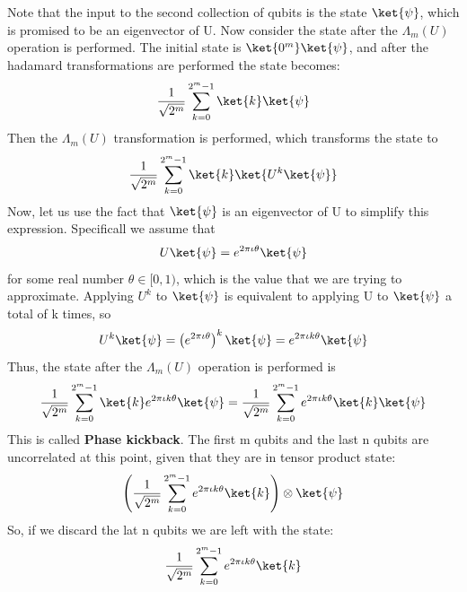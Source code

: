 \documentclass[12pt, oneside]{book}
\theoremstyle{definition}
\theoremstyle{definition}
\theoremstyle{remark}
\begin{document}
Note that the input to the second collection of qubits is the state $\ket{\psi}$, which is promised to be an eigenvector of U.
Now consider the state after the $\Lambda_m(U)$ operation is performed. The initial state is $\ket{0^m}\ket{\psi}$, and after the hadamard transformations are performed the state becomes:
\[
\frac{1}{\sqrt{2^m}}\sum_{k=0}^{2^m-1}\ket{k}\ket{\psi}
\]
Then the $\Lambda_m(U)$ transformation is performed, which transforms the state to
\[
\frac{1}{\sqrt{2^m}}\sum_{k=0}^{2^m-1}\ket{k}\ket{U^k\ket{\psi}}
\]
Now, let us use the fact that $\ket{\psi}$ is an eigenvector of U to simplify this expression. Specificall we assume that 
\[
U\ket{\psi}=e^{2\pi\iota \theta}\ket{\psi}
\]
for some real number $\theta \in [0,1)$, which is the value that we are trying to approximate. 
Applying $U^k$ to $\ket{\psi}$ is equivalent to applying U to $\ket{\psi}$ a total of k times, so
\[
U^k\ket{\psi}=\left(e^{2\pi\iota \theta}\right)^k\ket{\psi}=e^{2\pi\iota k\theta}\ket{\psi}
\]
Thus, the state after the $\Lambda_m(U)$ operation is performed is
\[
\frac{1}{\sqrt{2^m}}\sum_{k=0}^{2^m-1}\ket{k}e^{2\pi\iota k\theta}\ket{\psi}=\frac{1}{\sqrt{2^m}}\sum_{k=0}^{2^m-1}e^{2\pi\iota k\theta}\ket{k}\ket{\psi}
\]
This is called \textbf{Phase kickback}. The first m qubits and the last n qubits are uncorrelated at this point, given that they are in tensor product state:
\[
\left(\frac{1}{\sqrt{2^m}}\sum_{k=0}^{2^m-1}e^{2\pi\iota k\theta}\ket{k}\right)\otimes\ket{\psi}
\]
So, if we discard the lat n qubits we are left with the state:
\[
\frac{1}{\sqrt{2^m}}\sum_{k=0}^{2^m-1}e^{2\pi\iota k\theta}\ket{k}
\]
\end{document}
